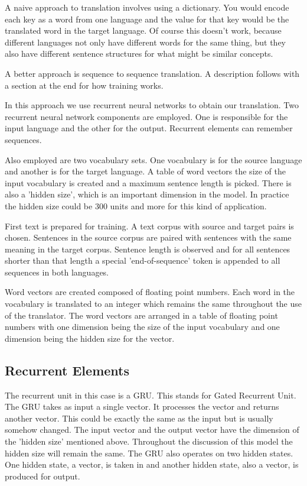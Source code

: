 A naive approach to translation involves using a dictionary. You would encode each key as a word from one language and the value for that key would be the translated word in the target language. Of course this doesn't work, because different languages not only have different words for the same thing, but they also have different sentence structures for what might be similar concepts.

A better approach is sequence to sequence translation. A description follows with a section at the end for how training works.

In this approach we use recurrent neural networks to obtain our translation. Two recurrent neural network components are employed. One is responsible for the input language and the other for the output. Recurrent elements can remember sequences. 

Also employed are two vocabulary sets. One vocabulary is for the source language and another is for the target language. A table of word vectors the size of the input vocabulary is created and a maximum sentence length is picked. There is also a 'hidden size', which is an important dimension in the model. In practice the hidden size could be 300 units and more for this kind of application.

First text is prepared for training. A text corpus with source and target pairs is chosen. Sentences in the source corpus are paired with sentences with the same meaning in the target corpus. Sentence length is observed and for all sentences shorter than that length a special 'end-of-sequence' token is appended to all sequences in both languages.

Word vectors are created composed of floating point numbers. Each word in the vocabulary is translated to an integer which remains the same throughout the use of the translator. The word vectors are arranged in a table of floating point numbers with one dimension being the size of the input vocabulary and one dimension being the hidden size for the vector.

\subsection*{Recurrent Elements}
The recurrent unit in this case is a GRU. This stands for Gated Recurrent Unit. The GRU takes as input a single vector. It processes the vector and returns another vector. This could be
exactly the same as the input but is usually somehow changed. The input vector and the output vector have the
dimension of the 'hidden size' mentioned above. Throughout the discussion of this model the hidden size will remain the same. The GRU also operates on two hidden states. One hidden state, a vector, is taken in and another hidden state, also a vector, is produced for output.

